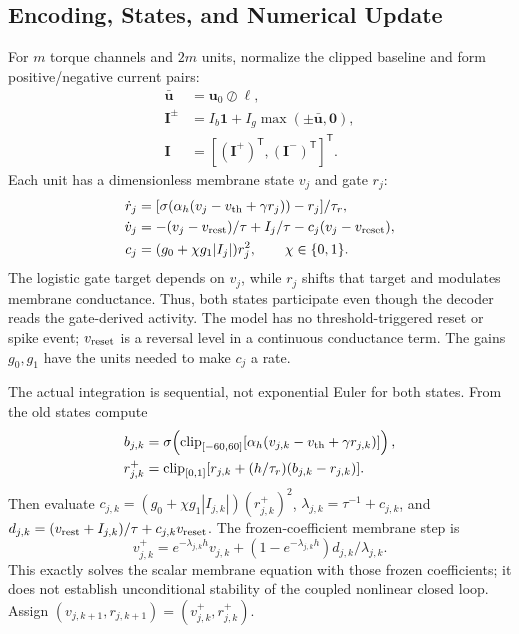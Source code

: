 \documentclass[letterpaper,10pt,conference]{IEEEtran}
\newcommand{\T}{^{\mathsf T}}
\newcommand{\clip}{\operatorname{clip}}
\begin{document}
\subsection{Encoding, States, and Numerical Update}
For $m$ torque channels and $2m$ units, normalize the clipped baseline and
form positive/negative current pairs:
\begin{equation}
 \begin{aligned}
 \bar{\bm u}&=\bm u_0\oslash\bm\ell,\\
 \bm I^{\pm}&=I_b\bm1+I_g\max(\pm\bar{\bm u},\bm0),\\
 \bm I&=[(\bm I^+)\T,(\bm I^-)\T]\T.
 \end{aligned}
 \label{eq:encoding}
\end{equation}
Each unit has a dimensionless membrane state $v_j$ and gate $r_j$:
\begin{align}
 \dot r_j&=[\sigma(\alpha_h(v_j-v_{\rm th}+\gamma r_j))-r_j]/\tau_r,\\
 \dot v_j&=-(v_j-v_{\rm rest})/\tau+I_j/\tau-c_j(v_j-v_{\rm reset}),\\
 c_j&=(g_0+\chi g_1|I_j|)r_j^2,\qquad \chi\in\{0,1\}.
 \label{eq:cmg}
\end{align}
The logistic gate target depends on $v_j$, while $r_j$ shifts that target
and modulates membrane conductance. Thus, both states participate even
though the decoder reads the gate-derived activity. The model has no
threshold-triggered reset or spike event; $v_{\rm reset}$ is a reversal
level in a continuous conductance term. The gains $g_0,g_1$ have the units
needed to make $c_j$ a rate.

The actual integration is sequential, not exponential Euler for both
states. From the old states compute
\begin{align}
 b_{j,k}&=\sigma\!\left(\clip_{[-60,60]}
       [\alpha_h(v_{j,k}-v_{\rm th}+\gamma r_{j,k})]\right),\\
 r_{j,k}^{+}&=\clip_{[0,1]}
       [r_{j,k}+(h/\tau_r)(b_{j,k}-r_{j,k})].
 \label{eq:gate_step}
\end{align}
Then evaluate $c_{j,k}=(g_0+\chi g_1|I_{j,k}|)(r_{j,k}^{+})^2$,
$\lambda_{j,k}=\tau^{-1}+c_{j,k}$, and
$d_{j,k}=(v_{\rm rest}+I_{j,k})/\tau+c_{j,k}v_{\rm reset}$. The
frozen-coefficient membrane step is
\begin{equation}
 v_{j,k}^{+}=e^{-\lambda_{j,k}h}v_{j,k}
       +(1-e^{-\lambda_{j,k}h})d_{j,k}/\lambda_{j,k}.
 \label{eq:mem_step}
\end{equation}
This exactly solves the scalar membrane equation with those frozen
coefficients; it does not establish unconditional stability of the coupled
nonlinear closed loop. Assign $(v_{j,k+1},r_{j,k+1})=(v_{j,k}^{+},r_{j,k}^{+})$.
\end{document}
